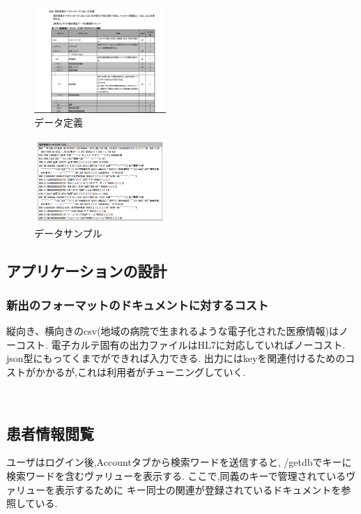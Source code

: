 	\begin{figure}[htbp]
		\begin{center}
			\includegraphics[width=5cm, bb=0 0 645 790]{./gazou/ss-mix_sample.png} %
		\end{center}
		\caption{データ定義}
		\label{ss-mix_sample}
	\end{figure}

	\begin{figure}[htbp]
		\begin{center}
			\includegraphics[width=5cm, bb=0 0 437 688]{./gazou/ss-mix_sampledata.png}
		\end{center}
		\caption{データサンプル}
		\label{ss-mix_sampledata}
	\end{figure}

\subsection{アプリケーションの設計}

	\subsubsection{新出のフォーマットのドキュメントに対するコスト}
	縦向き、横向きのcsv(地域の病院で生まれるような電子化された医療情報)はノーコスト.
	電子カルテ固有の出力ファイルはHL7に対応していればノーコスト.
	json型にもってくまでができれば入力できる.
	出力にはkeyを関連付けるためのコストがかかるが,これは利用者がチューニングしていく.


\subsection{患者情報閲覧}
	ユーザはログイン後,Accountタブから検索ワードを送信すると,
	/getdbでキーに検索ワードを含むヴァリューを表示する.
	ここで,同義のキーで管理されているヴァリューを表示するために
	キー同士の関連が登録されているドキュメントを参照している.



